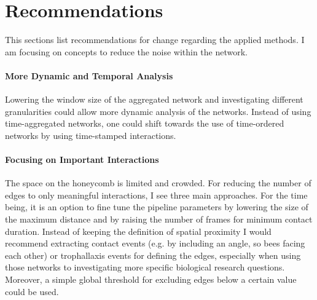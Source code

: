 \section{Recommendations}
This sections list recommendations for change regarding the applied methods. I am focusing on concepts to reduce the noise within the network.


\paragraph{More Dynamic and Temporal Analysis}
Lowering the window size of the aggregated network and investigating different granularities could allow more dynamic analysis of the networks. Instead of using time-aggregated networks, one could shift towards the use of time-ordered networks by using time-stamped interactions.

\paragraph{Focusing on Important Interactions}
The space on the honeycomb is limited and crowded. For reducing the number of edges to only meaningful interactions, I see three main approaches. For the time being, it is an option to fine tune the pipeline parameters by lowering the size of the maximum distance and by raising the number of frames for minimum contact duration. Instead of keeping the definition of spatial proximity I would recommend extracting contact events (e.g. by including an angle, so bees facing each other) or trophallaxis events for defining the edges, especially when using those networks to investigating more specific biological research questions. Moreover, a simple global threshold for excluding edges below a certain value could be used.

